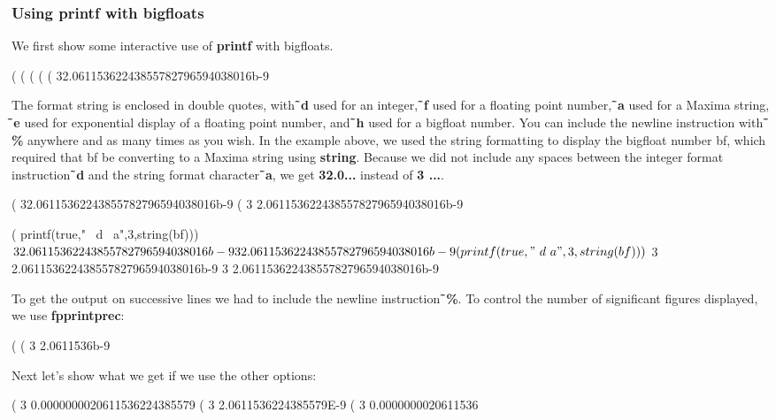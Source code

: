 \documentclass[12pt]{article}
\begin{document}
\subsubsection*{Using \textbf{printf} with bigfloats}
We first show some interactive use of \textbf{printf} with bigfloats. 
\begin{myVerbatim}
(%
(%
(%
(%
(%
32.06115362243855782796594038016b-9
\end{myVerbatim} 
The format string is enclosed in double quotes, with \textbf{\~ \,d} used for an integer,
  \textbf{\~ \,f} used for a floating point number, \textbf{\~ \,a} used for a Maxima string,
   \textbf{\~ \,e} used for exponential display of a floating point number, and
   \textbf{\~ \,h} used for a bigfloat number.
You can include the newline instruction with \textbf{\~ \,\%} anywhere and as many times as you 
  wish.
In the example above, we used the string formatting to display the bigfloat
  number bf, which required that bf be converting to a Maxima string using \textbf{string}.
Because we did not include any spaces between the integer format instruction \textbf{\~ \,d} and
  the string format character \textbf{\~ \,a}, we get \textbf{32.0...} instead of \textbf{3 ...}. 
\begin{myVerbatim}
(%
  32.06115362243855782796594038016b-9
(%
  3    2.06115362243855782796594038016b-9
\end{myVerbatim}
\newpage
\begin{myVerbatim}
(%
           printf(true,"  ~d    ~a",3,string(bf)))$
  3    2.06115362243855782796594038016b-9  3    2.06115362243855782796594038016b-9
(%
           printf(true,"  ~d    ~a",3,string(bf)))$
  3    2.06115362243855782796594038016b-9
  3    2.06115362243855782796594038016b-9
\end{myVerbatim} 
To get the output on successive lines we had to include the newline 
  instruction \textbf{\~ \,\%}.
To control the number of significant figures displayed, we use \textbf{fpprintprec}: 
\begin{myVerbatim}
(%
(%
  3    2.0611536b-9
\end{myVerbatim} 
Next let's show what we get if we use the other options: 
\begin{myVerbatim}
(%
  3    0.0000000020611536224385579
(%
  3    2.0611536224385579E-9
(%
  3    0.0000000020611536
\end{myVerbatim} 
\end{document}
